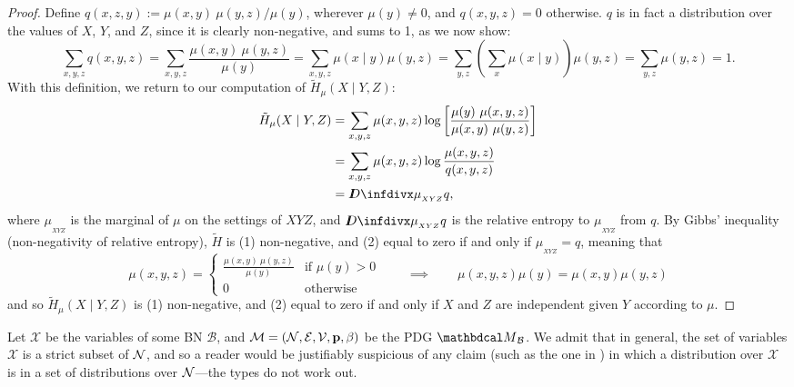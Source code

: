 {\begin{proof}
Define $q(x,z,y) := {\mu(x,y)\ \mu(y,z) }/{\mu(y)}$, wherever
			$\mu(y)\neq 0$, and $q(x,y,z) = 0$ otherwise. $q$ is in fact
	a distribution over the values of $X$, $Y$, and $Z$, since it  
is clearly non-negative, and sums to 1, as we now show:
\[
\sum_{x,y,z} q(x,y, z) = \sum_{x,y,z} \frac{\mu(x,y)\ \mu(y,z)}{\mu(y)}
= \sum_{x,y,z} \mu(x \mid y) \mu(y,z)
= \sum_{y,z} \left(\sum_x \mu(x \mid y)\right) \mu(y,z)
= \sum_{y,z}  \mu(y,z)
		= 1.
\]	
With this definition, we return to our computation of $\tilde H_\mu(X \mid Y, Z)$:
\begin{align*}
	\tilde H_\mu(X \mid Y, Z) &= \sum_{x,y, z}  \mu(x,y ,z) \log \left[\frac{\mu(y)\ \mu(x,y,z)}{\mu(x,y)\ \mu(y,z)} \right]  \\ %
	&= \sum_{x,y, z}  \mu(x,y ,z) \log \frac{\mu(x,y,z)}{q(x,y,z)}  \\
					&= \kldiv{\mu_{_{XYZ}}}{q},
\end{align*}
where $\mu_{_{XYZ}}$ is the marginal of $\mu$ on the settings of $XYZ$, and $\kldiv{\mu_{_{XYZ}}}{q}$ is the relative entropy to $\mu_{_{XYZ}}$ from $q$. By Gibbs' inequality (non-negativity of relative entropy), $\tilde H$ is  (1) non-negative, and (2) equal to zero if and only if $\mu_{_{XYZ}} = q$, meaning that 
\[  \mu(x,y,z) =\begin{cases} \frac{\mu(x,y)\ \mu(y,z)}{\mu(y)} & \text{if }\mu(y) > 0\\ 0 & \text{otherwise} \end{cases} \qquad \implies \qquad \mu(x,y,z) \mu(y) = \mu(x,y) \mu(y, z) \] 
and so $\tilde H_\mu(X \mid Y, Z)$ is (1) non-negative, and
	(2) equal to zero if and only if $X$ and $Z$ are independent
			given $Y$ according to $\mu$. 
\end{proof}
}

Let $\mathcal X$ be the variables of some BN $\mathcal B$, and $\mathcal M = (\mathcal N, \mathcal E, \mathcal V, \mathbf{p}, \beta)$
be the PDG $\PDGof{\mathcal B}$. We admit that in general, the set of variables
$\mathcal X$ is a strict subset of $\mathcal N$, and so a reader would be justifiably
suspicious of any claim (such as the one in ) in which a distribution over $\mathcal X$ is in a set of distributions over $\mathcal N$---the types do not work out. 

